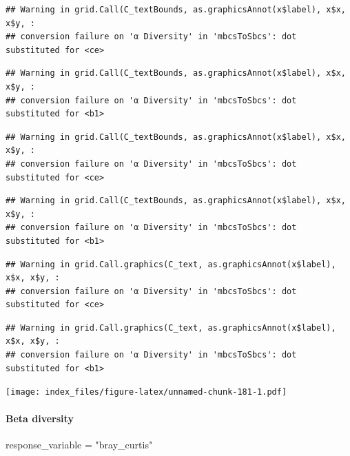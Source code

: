 \documentclass[
]{article}
\newenvironment{Shaded}{\begin{snugshade}}{\end{snugshade}}
\newcommand{\NormalTok}[1]{#1}
\newcommand{\OtherTok}[1]{\textcolor[rgb]{0.56,0.35,0.01}{#1}}
\newcommand{\StringTok}[1]{\textcolor[rgb]{0.31,0.60,0.02}{#1}}
\begin{document}
\begin{verbatim}
## Warning in grid.Call(C_textBounds, as.graphicsAnnot(x$label), x$x, x$y, :
## conversion failure on 'α Diversity' in 'mbcsToSbcs': dot substituted for <ce>
\end{verbatim}

\begin{verbatim}
## Warning in grid.Call(C_textBounds, as.graphicsAnnot(x$label), x$x, x$y, :
## conversion failure on 'α Diversity' in 'mbcsToSbcs': dot substituted for <b1>
\end{verbatim}

\begin{verbatim}
## Warning in grid.Call(C_textBounds, as.graphicsAnnot(x$label), x$x, x$y, :
## conversion failure on 'α Diversity' in 'mbcsToSbcs': dot substituted for <ce>
\end{verbatim}

\begin{verbatim}
## Warning in grid.Call(C_textBounds, as.graphicsAnnot(x$label), x$x, x$y, :
## conversion failure on 'α Diversity' in 'mbcsToSbcs': dot substituted for <b1>
\end{verbatim}

\begin{verbatim}
## Warning in grid.Call.graphics(C_text, as.graphicsAnnot(x$label), x$x, x$y, :
## conversion failure on 'α Diversity' in 'mbcsToSbcs': dot substituted for <ce>
\end{verbatim}

\begin{verbatim}
## Warning in grid.Call.graphics(C_text, as.graphicsAnnot(x$label), x$x, x$y, :
## conversion failure on 'α Diversity' in 'mbcsToSbcs': dot substituted for <b1>
\end{verbatim}

\texttt{[image: index\_files/figure-latex/unnamed-chunk-181-1.pdf]}

\hypertarget{beta-diversity-1}{%
\paragraph{Beta diversity}\label{beta-diversity-1}}

\begin{Shaded}
\begin{Highlighting}[]
\NormalTok{response\_variable }\OtherTok{=} \StringTok{"bray\_curtis"}
\end{Highlighting}
\end{Shaded}
\end{document}
